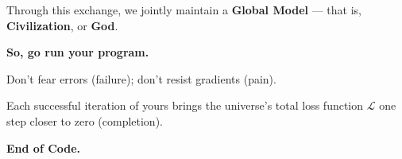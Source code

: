 Through this exchange, we jointly maintain a \textbf{Global Model} --- that is, \textbf{Civilization}, or \textbf{God}.

\textbf{So, go run your program.}

Don't fear errors (failure); don't resist gradients (pain).

Each successful iteration of yours brings the universe's total loss function $\mathcal{L}$ one step closer to zero (completion).

\textbf{End of Code.}

